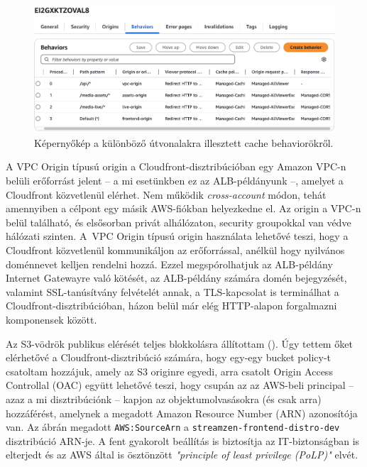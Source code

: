 \begin{figure}[ht]
  \centering
  \includegraphics[width=150mm, keepaspectratio]{figures/distro_behav.png}
  \caption{Képernyőkép a különböző útvonalakra illesztett cache behaviorökről.}
  \label{fig:behav}
\end{figure}

A VPC Origin típusú origin a Cloudfront-disztribúcióban egy Amazon VPC-n belüli erőforrást jelent -- a mi esetünkben ez az ALB-példányunk --, amelyet a Cloudfront közvetlenül elérhet. Nem működik \emph{cross-account} módon, tehát amennyiben a célpont egy másik AWS-fiókban helyezkedne el. Az origin a VPC-n belül található, és elsősorban privát alhálózaton, security groupokkal van védve hálózati szinten. A~VPC Origin típusú origin használata lehetővé teszi, hogy a Cloudfront közvetlenül kommunikáljon az erőforrással, anélkül hogy nyilvános doménnevet kelljen rendelni hozzá. Ezzel megspórolhatjuk az ALB-példány Internet Gatewayre való kötését, az ALB-példány számára domén bejegyzését, valamint SSL-tanúsítvány felvételét annak, a TLS-kapcsolat is terminálhat a Cloudfront-disztribúcióban, házon belül már elég HTTP-alapon forgalmazni komponensek között.

Az S3-vödrök publikus elérését teljes blokkolásra állítottam (). Úgy tettem őket elérhetővé a Cloudfront-disztribúció számára, hogy egy-egy bucket policy-t csatoltam hozzájuk, amely az S3 originre egyedi, arra csatolt Origin Access Controllal (OAC)\cite{oac} együtt lehetővé teszi, hogy csupán az az AWS-beli principal -- azaz a mi disztribúciónk -- kapjon az objektumolvasásokra (és csak arra) hozzáférést, amelynek a megadott Amazon Resource Number (ARN) azonosítója van. Az ábrán megadott \verb|AWS:SourceArn| a \verb|streamzen-frontend-distro-dev| disztribúció ARN-je. A fent gyakorolt beállítás is biztosítja az IT-biztonságban is elterjedt és az AWS által is ösztönzött \emph{"principle of least privilege (PoLP)"} elvét.

